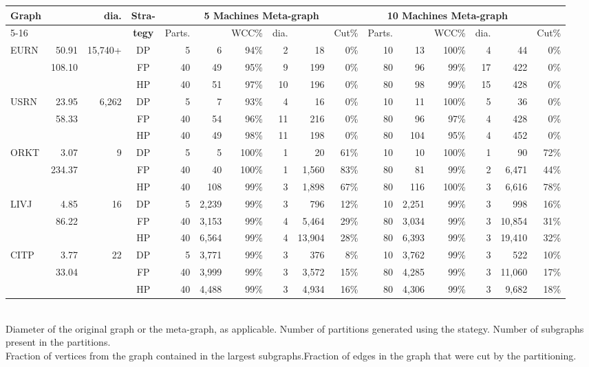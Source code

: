 \documentclass[10pt,conference, compsocconf]{IEEEtran}
\begin{document}
\begin{table*}[t]
\centering
\scriptsize
\caption{Graph descriptions, and meta-graph details after partitioning on 5 and 10 Machines.} 
\begin{tabular}{p{.8cm}|r|r||c||r|r|r|r|r|r||r|r|r|r|r|r}
\hline
{\textbf{Graph}} &  &  dia. & \textbf{{Stra-}}& \multicolumn{6}{c||}{\textbf{5 Machines Meta-graph}} & \multicolumn{5}{c}{\textbf{10 Machines Meta-graph}}\\
\cline{5-16}
&  & & \textbf{{tegy}} & Parts. &  &WCC\%& dia.& &Cut\%& Parts. &  &WCC\%& dia.& &Cut\% \\
\hline
\hline
EURN & 50.91 & 15,740+ & DP &   5&  6&94\%& 2& 18& 0\%&  10& 13 & 100\%& 4& 44&  0\%\\
     & 108.10        & & FP &  40& 49&95\%& 9& 199& 0\%&  80& 96& 99\%& 17&  422&  0\%\\
                    && & HP &  40& 51&97\%&10& 196& 0\%&  80& 98& 99\%& 15&  428&  0\%\\
\hline
USRN & 23.95 & 6,262 & DP &   5&  7& 93\%&  4& 16&  0\%&  10& 11 & 100\%& 5& 36&    0\%\\
           & 58.33 & & FP &  40& 54& 96\%& 11& 216&  0\%&  80& 96& 97\%& 4&  428&  0\%\\
                  && & HP &  40& 49& 98\%& 11& 198&  0\%&  80& 104& 95\%& 4& 452&  0\%\\
\hline
\hline
ORKT & 3.07   & 9 & DP &   5&   5 & 100\% & 1& 20& 61\%&  10&  10 & 100\% & 1& 90& 72\%\\
     & 234.37 &   & FP &  40&  40 & 100\% & 1& 1,560& 83\%&  80&  81 & 99\% & 2& 6,471& 44\%\\
&&                & HP &  40& 108 &  99\% & 3& 1,898& 67\%&  80& 116 &  100\% & 3& 6,616&  78\%\\
\hline
LIVJ & 4.85 & 16 & DP &   5& 2,239& 99\%& 3& 796& 12\%&  10 & 2,251& 99\%& 3& 998& 16\%\\
       & 86.22 & & FP &  40& 3,153& 99\%& 4&  5,464& 29\%&  80 & 3,034& 99\%& 3& 10,854& 31\% \\
               &&& HP &  40& 6,564& 99\%& 4&  13,904& 28\%&  80 & 6,393& 99\%& 3& 19,410& 32\% \\
\hline 
CITP & 3.77 & 22 & DP &  5& 3,771& 99\%& 3& 376& 8\%&  10& 3,762& 99\%& 3& 522& 10\%\\
       & 33.04 & & FP &  40& 3,999& 99\%& 3& 3,572& 15\%&  80& 4,285& 99\%& 3& 11,060& 17\%\\
               &&& HP &  40& 4,488& 99\%& 3& 4,934& 16\%&  80& 4,306& 99\%& 3& 9,682& 18\%\\
\hline 
\end{tabular}
\\  Diameter of the original graph or the meta-graph, as applicable.  \quad   Number of partitions  generated using the stategy. \quad   Number of subgraphs  present in the  partitions.
\\ Fraction of vertices from the graph contained in the largest  subgraphs.\qquad\qquad   Fraction of edges in the graph that were cut by the partitioning.
\label{tbl:graphs}
\end{table*}
\end{document}
